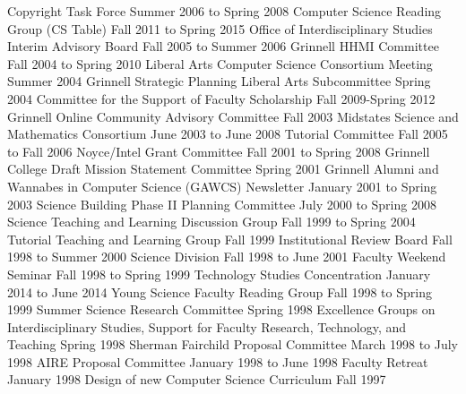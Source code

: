 \begin{cventries}
  {Copyright Task Force}
  {Summer 2006 to Spring 2008}
  {Computer Science Reading Group (CS Table)}
  {Fall 2011 to Spring 2015}
  {Office of Interdisciplinary Studies Interim Advisory Board}
  {Fall 2005 to Summer 2006}
  {Grinnell HHMI Committee}
  {Fall 2004 to Spring 2010}
  {Liberal Arts Computer Science Consortium Meeting}
  {Summer 2004}
  {Grinnell Strategic Planning Liberal Arts Subcommittee}
  {Spring 2004}
  {Committee for the Support of Faculty Scholarship}
  {Fall 2009-Spring 2012}
  {Grinnell Online Community Advisory Committee}
  {Fall 2003}
  {Midstates Science and Mathematics Consortium}
  {June 2003 to June 2008}
  {Tutorial Committee}
  {Fall 2005 to Fall 2006}
  {Noyce/Intel Grant Committee}
  {Fall 2001 to Spring 2008}
  {Grinnell College Draft Mission Statement Committee}
  {Spring 2001}
  {Grinnell Alumni and Wannabes in Computer Science (GAWCS) Newsletter}
  {January 2001 to Spring 2003}
  {Science Building Phase II Planning Committee}
  {July 2000 to Spring 2008}
  {Science Teaching and Learning Discussion Group}
  {Fall 1999 to Spring 2004}
  {Tutorial Teaching and Learning Group}
  {Fall 1999}
  {Institutional Review Board}
  {Fall 1998 to Summer 2000}
  {Science Division}
  {Fall 1998 to June 2001}
  {Faculty Weekend Seminar}
  {Fall 1998 to Spring 1999}
  {Technology Studies Concentration}
  {January 2014 to June 2014}
  {Young Science Faculty Reading Group}
  {Fall 1998 to Spring 1999}
  {Summer Science Research Committee}
  {Spring 1998}
  {Excellence Groups on Interdisciplinary Studies, Support for Faculty Research, Technology, and Teaching}
  {Spring 1998}
  {Sherman Fairchild Proposal Committee}
  {March 1998 to July 1998}
  {AIRE Proposal Committee}
  {January 1998 to June 1998}
  {Faculty Retreat}
  {January 1998}
  {Design of new Computer Science Curriculum}
  {Fall 1997}

\end{cventries}
